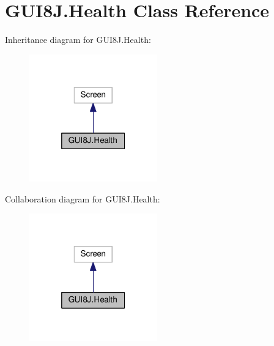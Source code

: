 \hypertarget{classGUI8J_1_1Health}{}\section{G\+U\+I8\+J.\+Health Class Reference}
\label{classGUI8J_1_1Health}


Inheritance diagram for G\+U\+I8\+J.\+Health\+:
\nopagebreak
\begin{figure}[H]
\begin{center}
\leavevmode
\includegraphics[width=157pt]{classGUI8J_1_1Health__inherit__graph}
\end{center}
\end{figure}


Collaboration diagram for G\+U\+I8\+J.\+Health\+:
\nopagebreak
\begin{figure}[H]
\begin{center}
\leavevmode
\includegraphics[width=157pt]{classGUI8J_1_1Health__coll__graph}
\end{center}
\end{figure}
